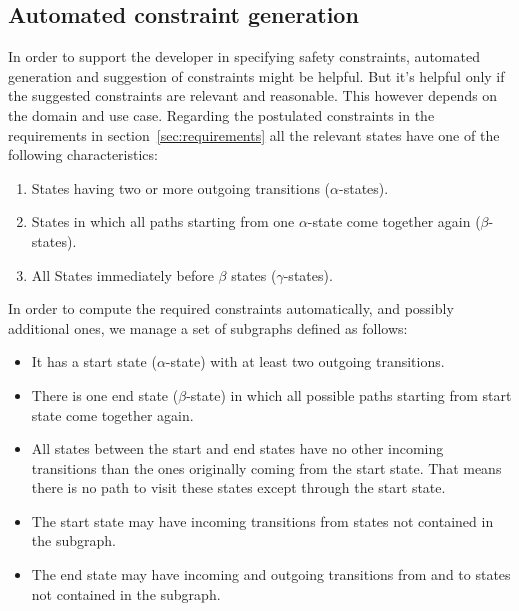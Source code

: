 \documentclass[conference]{IEEEtran}
\begin{document}
\subsection{Automated constraint generation}
\label{sec:automatedconstraintgeneration}

In order to support the developer in specifying safety constraints, automated generation and suggestion of constraints might be helpful. But it's helpful only if the suggested constraints are relevant and reasonable. This however depends on the domain and use case.
Regarding the postulated constraints in the requirements in section~\ref{sec:requirements} all the relevant states have one of the following characteristics:

\begin{enumerate}
	\item States having two or more outgoing transitions ($\alpha$-states).
	\item States in which all paths starting from one $\alpha$-state come together again ($\beta$-states).
	\item All States immediately before $\beta$ states ($\gamma$-states).
\end{enumerate}

In order to compute the required constraints automatically, and possibly additional ones, we manage a set of subgraphs defined as follows:

\begin{itemize}
	\item It has a start state ($\alpha$-state) with at least two outgoing transitions.
	\item There is one end state ($\beta$-state) in which all possible paths starting from start state come together again.
	\item All states between the start and end states have no other incoming transitions than the ones originally coming from the start state. That means there is no path to visit these states except through the start state.
	\item The start state may have incoming transitions from states not contained in the subgraph.
	\item The end state may have incoming and outgoing transitions from and to states not contained in the subgraph.
\end{itemize}
\end{document}
